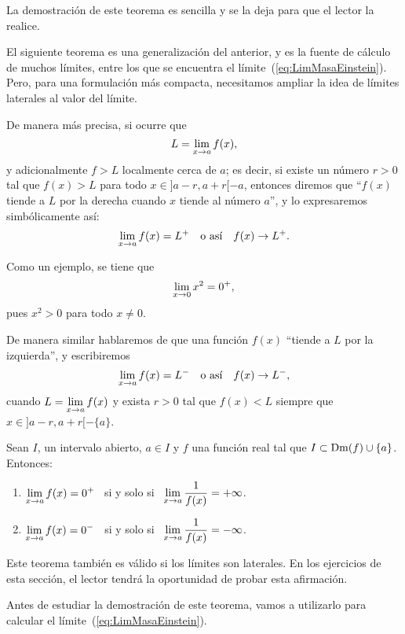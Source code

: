 La demostración de este teorema es sencilla y se la deja para que el lector la realice.

El siguiente teorema es una generalización del anterior, y es la fuente de cálculo de muchos
límites, entre los que se encuentra el límite~(\ref{eq:LimMasaEinstein}). Pero, para una
formulación más compacta, necesitamos ampliar la idea de límites laterales al valor del límite.

De manera más precisa, si ocurre que
\[
L = \limjc{f(x)}{x}{a},
\]
y adicionalmente $f>L$ localmente cerca de $a$; es decir, si existe un número $r > 0$
tal que $f(x) > L$ para todo $x \in ]a-r,a+r[-{a}$, entonces diremos que ``$f(x)$ tiende a $L$ por la
derecha cuando $x$ tiende al número $a$'', y lo expresaremos simbólicamente así:
\[
\limjc{f(x)}{x}{a} = L^+\quad\text{o así}\quad f(x) \rightarrow L^+.
\]

Como un ejemplo, se tiene que
\[
\limjc{x^2}{x}{0} = 0^+,
\]
pues $x^2 > 0 $ para todo $x\neq 0$.

De manera similar hablaremos de que una función $f(x)$ ``tiende a $L$ por la izquierda'', y
escribiremos
\[
\limjc{f(x)}{x}{a} = L^-\quad\text{o así}\quad f(x) \rightarrow L^-,
\]
cuando $\displaystyle L = \limjc{f(x)}{x}{a}$ y exista $r > 0$ tal que $f(x) < L$ siempre que $x
\in ]a-r,a+r[-\{a\}$.

\begin{teocal}\label{teo:LimGeneralInfUnoSobreCero}%
Sean $I$, un intervalo abierto, $a\in I$ y $f$ una función real tal que $I \subset
\Dm(f) \cup \{a\}$. Entonces:
\begin{enumerate}
\item $\displaystyle\limjc{f(x)}{x}{a} = 0^+$ \ si y solo si \
    $\displaystyle\limjc{\frac{1}{f(x)}}{x}{a} = +\infty$.
\item $\displaystyle\limjc{f(x)}{x}{a} = 0^-$ \ si y solo si \
    $\displaystyle\limjc{\frac{1}{f(x)}}{x}{a} = -\infty$.
\end{enumerate}
\end{teocal}

Este teorema también es válido si los límites son laterales. En los ejercicios de esta sección, el
lector tendrá la oportunidad de probar esta afirmación.

Antes de estudiar la demostración de este teorema, vamos a utilizarlo para calcular el
límite~(\ref{eq:LimMasaEinstein}).

